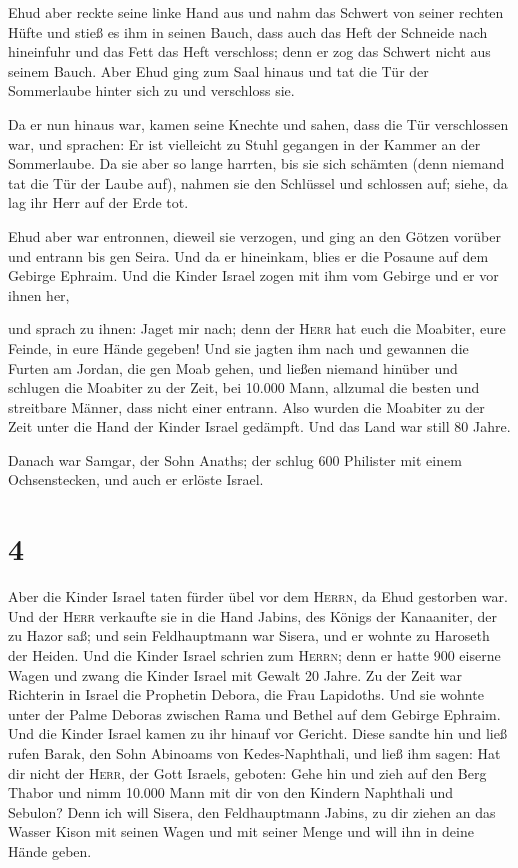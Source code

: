  Ehud aber reckte seine linke Hand aus und nahm das
Schwert von seiner rechten Hüfte und stieß es ihm in seinen Bauch,
 dass auch das Heft der Schneide nach hineinfuhr und das
Fett das Heft verschloss; denn er zog das Schwert nicht aus seinem
Bauch.  Aber Ehud ging zum Saal hinaus und tat die Tür
der Sommerlaube hinter sich zu und verschloss sie.

 Da er nun hinaus war, kamen seine Knechte und sahen,
dass die Tür verschlossen war, und sprachen: Er ist vielleicht zu Stuhl
gegangen in der Kammer an der Sommerlaube.  Da sie aber
so lange harrten, bis sie sich schämten (denn niemand tat die Tür der
Laube auf), nahmen sie den Schlüssel und schlossen auf; siehe, da lag
ihr Herr auf der Erde tot.

 Ehud aber war entronnen, dieweil sie verzogen, und ging
an den Götzen vorüber und entrann bis gen Seira.  Und da
er hineinkam, blies er die Posaune auf dem Gebirge Ephraim. Und die
Kinder Israel zogen mit ihm vom Gebirge und er vor ihnen her,

 und sprach zu ihnen: Jaget mir nach; denn der
\textsc{Herr} hat euch die Moabiter, eure Feinde, in eure Hände gegeben!
Und sie jagten ihm nach und gewannen die Furten am Jordan, die gen Moab
gehen, und ließen niemand hinüber  und schlugen die
Moabiter zu der Zeit, bei 10.000 Mann, allzumal die besten und
streitbare Männer, dass nicht einer entrann.  Also wurden
die Moabiter zu der Zeit unter die Hand der Kinder Israel gedämpft. Und
das Land war still 80 Jahre.

 Danach war Samgar, der Sohn Anaths; der schlug 600
Philister mit einem Ochsenstecken, und auch er erlöste Israel.

\hypertarget{section-3}{%
\section{4}\label{section-3}}

 Aber die Kinder Israel taten fürder übel vor dem
\textsc{Herrn}, da Ehud gestorben war.  Und der
\textsc{Herr} verkaufte sie in die Hand Jabins, des Königs der
Kanaaniter, der zu Hazor saß; und sein Feldhauptmann war Sisera, und er
wohnte zu Haroseth der Heiden.  Und die Kinder Israel
schrien zum \textsc{Herrn}; denn er hatte 900 eiserne Wagen und zwang
die Kinder Israel mit Gewalt 20 Jahre.  Zu der Zeit war
Richterin in Israel die Prophetin Debora, die Frau Lapidoths.
 Und sie wohnte unter der Palme Deboras zwischen Rama und
Bethel auf dem Gebirge Ephraim. Und die Kinder Israel kamen zu ihr
hinauf vor Gericht.  Diese sandte hin und ließ rufen
Barak, den Sohn Abinoams von Kedes-Naphthali, und ließ ihm sagen: Hat
dir nicht der \textsc{Herr}, der Gott Israels, geboten: Gehe hin und
zieh auf den Berg Thabor und nimm 10.000 Mann mit dir von den Kindern
Naphthali und Sebulon?  Denn ich will Sisera, den
Feldhauptmann Jabins, zu dir ziehen an das Wasser Kison mit seinen Wagen
und mit seiner Menge und will ihn in deine Hände geben.

